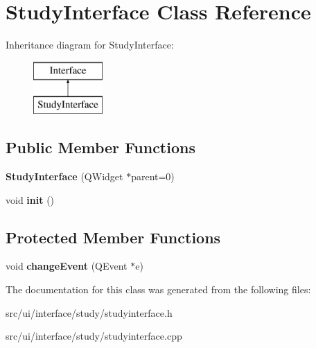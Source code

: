 \hypertarget{classStudyInterface}{
\section{StudyInterface Class Reference}
\label{classStudyInterface}
}
Inheritance diagram for StudyInterface:\begin{figure}[H]
\begin{center}
\leavevmode
\includegraphics[height=2cm]{classStudyInterface}
\end{center}
\end{figure}
\subsection*{Public Member Functions}
\begin{DoxyCompactItemize}
\item 
\hypertarget{classStudyInterface_ad4013c829e21c5b1e559508232cd3292}{
{\bfseries StudyInterface} (QWidget $\ast$parent=0)}
\label{classStudyInterface_ad4013c829e21c5b1e559508232cd3292}

\item 
\hypertarget{classStudyInterface_ac7c876ab6cbe2a419070d6c9f321d941}{
void {\bfseries init} ()}
\label{classStudyInterface_ac7c876ab6cbe2a419070d6c9f321d941}

\end{DoxyCompactItemize}
\subsection*{Protected Member Functions}
\begin{DoxyCompactItemize}
\item 
\hypertarget{classStudyInterface_a6c21090fbc9d7d116b7cac407bf15ee4}{
void {\bfseries changeEvent} (QEvent $\ast$e)}
\label{classStudyInterface_a6c21090fbc9d7d116b7cac407bf15ee4}

\end{DoxyCompactItemize}


The documentation for this class was generated from the following files:\begin{DoxyCompactItemize}
\item 
src/ui/interface/study/studyinterface.h\item 
src/ui/interface/study/studyinterface.cpp\end{DoxyCompactItemize}
